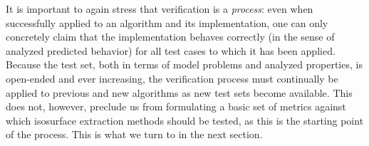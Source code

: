 It is important to again stress that verification is a \emph{process}: even
when successfully applied to an algorithm and its implementation, 
one can only concretely claim that the implementation behaves correctly
(in the sense of analyzed predicted behavior) for all test cases to which
it has been applied.  Because the test set, both in terms of model
problems and analyzed properties, is open-ended and ever increasing, 
the verification process must continually be applied to previous and
new algorithms as new test sets become available.  This does not, however,
preclude us from formulating a basic set of metrics against which
isosurface extraction methods should be tested, as this is the starting
point of the process.  This is what we turn to in the next section.
